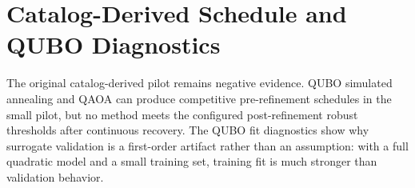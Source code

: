 \documentclass[11pt]{article}
\begin{document}
\begin{table}[htbp]
\centering
\caption{Tail-coast recorded-error threshold audit for \texttt{tail\_coast\_all\_one\_two\_segment\_t5\_portfolio}.}
\label{tab:supp_tail_coast_threshold_audit}
\resizebox{0.95\textwidth}{!}{}
\end{table}

\begin{table}[htbp]
\centering
\caption{Tail-coast branch audit parsed from the historical \texttt{branch\_results} JSON field.}
\label{tab:supp_tail_coast_branch_audit}
\resizebox{\textwidth}{!}{}
\end{table}

\begin{table}[htbp]
\centering
\caption{Deterministic nominal-control replay/stress validation from recorded sidecars, including endpoint-plus-midpoint replay for the independent-midpoint Hermite--Simpson rows. This table checks nominal sidecar replay only and does not rerun missed-thrust branch recovery.}
\label{tab:supp_replay_stress_validation}
\resizebox{\textwidth}{!}{}
\end{table}

\begin{table}[htbp]
\centering
\caption{Deterministic independent-HS branch-control replay from persisted endpoint-plus-midpoint sidecars. The replay table is generated from recorded manifests and sidecars only and is limited to normalized CR3BP propagation.}
\label{tab:supp_independent_hs_branch_control_replay}
\resizebox{\textwidth}{!}{}
\end{table}

\clearpage

\section{Catalog-Derived Schedule and QUBO Diagnostics}

The original catalog-derived pilot remains negative evidence. QUBO simulated annealing and QAOA can produce competitive pre-refinement schedules in the small pilot, but no method meets the configured post-refinement robust thresholds after continuous recovery. The QUBO fit diagnostics show why surrogate validation is a first-order artifact rather than an assumption: with a full quadratic model and a small training set, training fit is much stronger than validation behavior.
\end{document}
